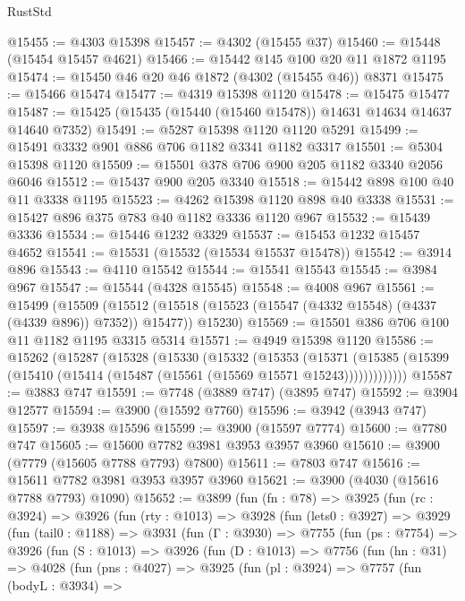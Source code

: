 \begin{lexlean}{RustStd}
\begin{coremodule}
@15455 := @4303 @15398
@15457 := @4302 (@15455 @37)
@15460 := @15448 (@15454 @15457 @4621)
@15466 := @15442 @145 @100 @20 @11 @1872 @1195
@15474 := @15450 @46 @20 @46 @1872 (@4302 (@15455 @46)) @8371
@15475 := @15466 @15474
@15477 := @4319 @15398 @1120
@15478 := @15475 @15477
@15487 := @15425 (@15435 (@15440 (@15460 @15478)) @14631 @14634 @14637 @14640 @7352)
@15491 := @5287 @15398 @1120 @1120 @5291
@15499 := @15491 @3332 @901 @886 @706 @1182 @3341 @1182 @3317
@15501 := @5304 @15398 @1120
@15509 := @15501 @378 @706 @900 @205 @1182 @3340 @2056 @6046
@15512 := @15437 @900 @205 @3340
@15518 := @15442 @898 @100 @40 @11 @3338 @1195
@15523 := @4262 @15398 @1120 @898 @40 @3338
@15531 := @15427 @896 @375 @783 @40 @1182 @3336 @1120 @967
@15532 := @15439 @3336
@15534 := @15446 @1232 @3329
@15537 := @15453 @1232 @15457 @4652
@15541 := @15531 (@15532 (@15534 @15537 @15478))
@15542 := @3914 @896
@15543 := @4110 @15542
@15544 := @15541 @15543
@15545 := @3984 @967
@15547 := @15544 (@4328 @15545)
@15548 := @4008 @967
@15561 := @15499
    (@15509
      (@15512 (@15518 (@15523 (@15547 (@4332 @15548) (@4337 (@4339 @896)) @7352)) @15477))
      @15230)
@15569 := @15501 @386 @706 @100 @11 @1182 @1195 @3315 @5314
@15571 := @4949 @15398 @1120
@15586 := @15262
    (@15287
      (@15328
        (@15330
          (@15332
            (@15353
              (@15371
                (@15385 (@15399 (@15410 (@15414 (@15487 (@15561 (@15569 @15571 @15243)))))))))))))
@15587 := @3883 @747
@15591 := @7748 (@3889 @747) (@3895 @747)
@15592 := @3904 @12577
@15594 := @3900 (@15592 @7760)
@15596 := @3942 (@3943 @747)
@15597 := @3938 @15596
@15599 := @3900 (@15597 @7774)
@15600 := @7780 @747
@15605 := @15600 @7782 @3981 @3953 @3957 @3960
@15610 := @3900 (@7779 (@15605 @7788 @7793) @7800)
@15611 := @7803 @747
@15616 := @15611 @7782 @3981 @3953 @3957 @3960
@15621 := @3900 (@4030 (@15616 @7788 @7793) @1090)
@15652 := @3899
    (fun (fn : @78) =>
    @3925
      (fun (rc : @3924) =>
      @3926
        (fun (rty : @1013) =>
        @3928
          (fun (lets0 : @3927) =>
          @3929
            (fun (tail0 : @1188) =>
            @3931
              (fun (Γ : @3930) =>
              @7755
                (fun (ps : @7754) =>
                @3926
                  (fun (S : @1013) =>
                  @3926
                    (fun (D : @1013) =>
                    @7756
                      (fun (hn : @31) =>
                      @4028
                        (fun (pns : @4027) =>
                        @3925
                          (fun (pl : @3924) =>
                          @7757
                            (fun (bodyL : @3934) =>

\end{coremodule}
\end{lexlean}
